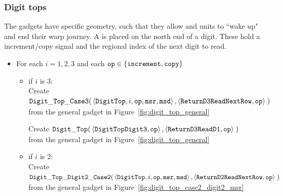 \subsubsection{Digit tops}
The {\dtop} gadgets have specific geometry, such that they allow {\firstwarp} and
{\secondwarp} units to ``wake up" and end their warp journey. A {\dtop} is placed on
the north end of a digit. These hold a increment/copy signal and the regional index
of the next digit to read.
\vspace{.5cm}

\begin{itemize}

    \item For each $i = 1,2,3$ and each ${\tt op} \in \{ {\tt increment, copy } \}$
    \begin{itemize}

        \item if $i$ is 3: \\
        Create
        $\begin{aligned}[t]
            {\tt Digit\_Top\_Case3}(& \left \langle {\tt DigitTop}, i, {\tt op}, {\tt msr}, {\tt msd} \right\rangle,
                             \left \langle {\tt ReturnD3ReadNextRow}, {\tt op} \right\rangle \;)
        \end{aligned}$ \\ from the general gadget in Figure~\ref{fig:digit_top_general}
        \vspace{.5cm}

        Create
        $\begin{aligned}[t]
            {\tt Digit\_Top}(& \left \langle {\tt DigitTopDigit3}, {\tt op} \right\rangle,
                    \left \langle {\tt ReturnD3ReadD1}, {\tt op} \right\rangle \;)
        \end{aligned}$ \\ from the general gadget in Figure~\ref{fig:digit_top_general}

        \vspace{.5cm}
        \item if $i$ is 2: \\
        Create
        $\begin{aligned}[t]
            {\tt Digit\_Top\_Digit2\_Case2}(& \left \langle {\tt DigitTop}, i, {\tt op}, {\tt msr}, {\tt msd} \right\rangle,
                               \left \langle {\tt ReturnD2ReadNextRow},  {\tt op} \right\rangle \;)
        \end{aligned}$ \\ from the general gadget in Figure~\ref{fig:digit_top_case2_digit2_msr}
        \vspace{.5cm}


\end{itemize}
\end{itemize}
